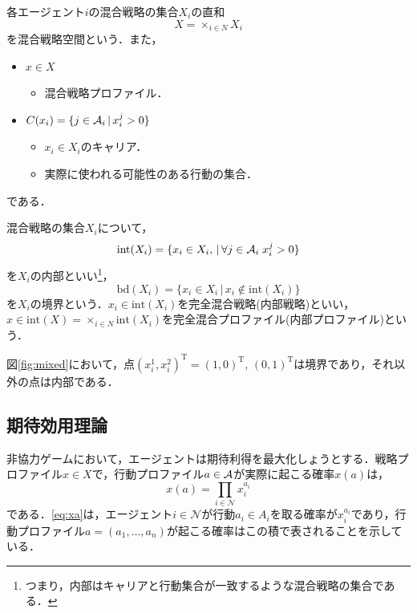 \documentclass{jsreport}
\begin{document}
各エージェント$i$の混合戦略の集合$X_i$の直和
\begin{equation}
  X = \times_{i \in N} X_i \nonumber
\end{equation}
を混合戦略空間という．また，
\begin{itemize}
  \item $x \in X$
  \begin{itemize}
    \item 混合戦略プロファイル．
  \end{itemize}
  \item $C(x_i) = \{j \in {\cal A}_i \, | \, x_i^j > 0\}$
  \begin{itemize}
    \item $x_i \in X_i$のキャリア．
    \item 実際に使われる可能性のある行動の集合．
  \end{itemize}
\end{itemize}
である．

混合戦略の集合$X_i$について，
\begin{equation}
  \mathrm{int}(X_i) = \{x_i \in X_i, \, | \, \forall j \in {\cal A}_i \; x_i^j > 0\} \nonumber
\end{equation}
を$X_i$の内部といい\footnote{つまり，内部はキャリアと行動集合が一致するような混合戦略の集合である．}，
\begin{equation}
  \mathrm{bd}(X_i) = \{x_i \in X_i \, | \, x_i \notin \mathrm{int}(X_i)\} \nonumber
\end{equation}
を$X_i$の境界という．$x_i \in \mathrm{int}(X_i)$を完全混合戦略(内部戦略)といい，$x \in \mathrm{int}(X) = \times_{i \in N} \mathrm{int}(X_i)$を完全混合プロファイル(内部プロファイル)という．

図\ref{fig:mixed}において，点$(x_i^1, x_i^2)^{\mathrm{T}} = (1, 0)^{\mathrm{T}}, \, (0, 1)^{\mathrm{T}}$は境界であり，それ以外の点は内部である．

\subsection{期待効用理論}
非協力ゲームにおいて，エージェントは期待利得を最大化しょうとする．戦略プロファイル$x \in X$で，行動プロファイル$a \in {\cal A}$が実際に起こる確率$x(a)$は，
\begin{equation}
  x(a) = \prod_{i \in \mathcal{N}} x_i^{a_i} \label{eq:xa}
\end{equation}
である．\eqref{eq:xa}は，エージェント$i \in \mathcal{N}$が行動$a_i \in A_i$を取る確率が$x_i^{a_i}$であり，行動プロファイル$a = (a_1, \ldots, a_n)$が起こる確率はこの積で表されることを示している．
\end{document}
